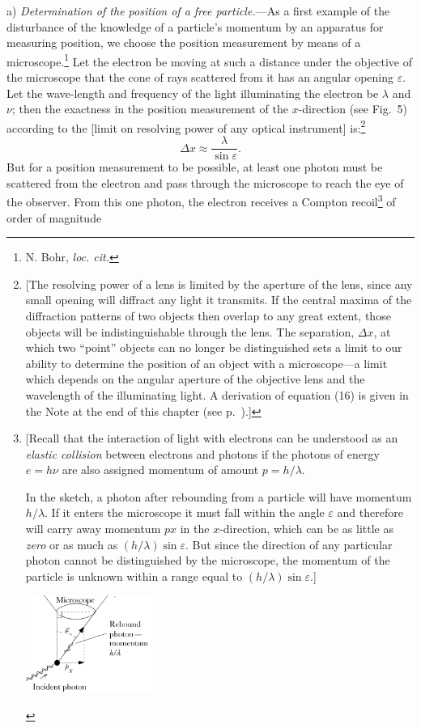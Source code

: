 a) \emph{Determination of the position of a free particle.}---As a first
example of the disturbance of the knowledge of a particle's momentum by an
apparatus for measuring position, we choose the position measurement by
means of a microscope.\footnote{N. Bohr, \emph{loc. cit.}} Let the
electron be moving at such a distance under the objective of the
microscope that the cone of rays scattered from it has an angular
opening $\varepsilon$. Let the wave-length and frequency of the light
illuminating the electron be $\lambda$ and $\nu$; then the exactness
in the position measurement of the $x$-direction (see Fig.\ 5)
according to the {[}limit on resolving power of any optical
instrument{]} is:\footnote{{[}The resolving power of a lens is limited
  by the aperture of the lens, since any small opening will diffract any
  light it transmits. If the central maxima of the diffraction patterns
  of two objects then overlap to any great extent, those objects will be
  indistinguishable through the lens. The separation, $\Delta x$, at
  which two ``point'' objects can no longer be distinguished sets a
  limit to our ability to determine the position of an object with a
  microscope---a limit which depends on the angular aperture of the
  objective lens and the wavelength of the illuminating light. A
  derivation of equation (16) is given in the Note at the end of this chapter (see p.~\pageref{p:heis16}).{]}}
%
\begin{equation*}\tag{16}
\Delta x \approx \frac{\lambda}{\sin \varepsilon}.\label{eq:heis16}
\end{equation*}
%
But for a position measurement to be possible, at least one photon must
be scattered from the electron and pass through the microscope to reach
the eye of the observer. From this one photon, the electron receives a
Compton recoil\footnote{{[}Recall that the interaction of light
  with electrons can be understood as an \emph{elastic collision}
  between electrons and photons if the photons of energy
  $e= h\nu$ are also assigned momentum of amount $p = h/\lambda$.

  In the sketch, a photon after rebounding from a particle will have
  momentum $h/\lambda$. If it enters the microscope it must fall
  within the angle $\varepsilon$ and therefore will carry away momentum
  $px$ in the $x$-direction, which can be as little as
  \emph{zero} or as much as $(h/\lambda)\sin \varepsilon$. But since the
  direction of any particular photon cannot be distinguished by the
  microscope, the momentum of the particle is unknown within a range
  equal to $(h/\lambda)\sin \varepsilon$.{]}
  \begin{center}
    \includegraphics[width=1.7in,height=1.24667in]{images/10_heisenberg/image054.png}
  \end{center}
  } of order of magnitude

